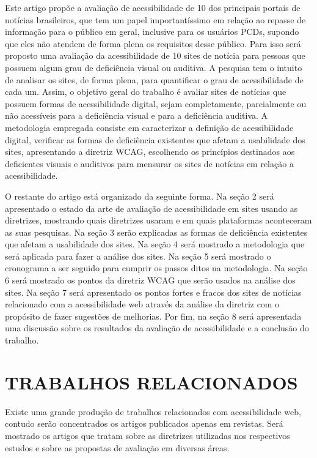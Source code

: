\documentclass[a4paper]{article}
\begin{document}
\begin{titlepage}
Este artigo propõe a avaliação de acessibilidade de 10 dos principais portais de notícias brasileiros, que tem um papel importantíssimo em relação ao repasse de informação para o público em geral, inclusive para os usuários PCDs, supondo que eles não atendem de forma plena os requisitos desse público. Para isso será proposto uma avaliação da acessibilidade de 10 sites de notícia para pessoas que possuem algum grau de deficiência visual ou auditiva. A pesquisa tem o intuito de analisar os sites, de forma plena, para quantificar o grau de acessibilidade de cada um. Assim, o objetivo geral do trabalho é avaliar sites de notícias que possuem formas de acessibilidade digital, sejam completamente, parcialmente ou não acessíveis para a deficiência visual e para a deficiência auditiva. A metodologia empregada consiste em caracterizar a definição de acessibilidade digital, verificar as formas de deficiência existentes que afetam a usabilidade dos sites, apresentando a diretriz WCAG, escolhendo os princípios destinados aos deficientes visuais e auditivos para mensurar os sites de notícias em relação a acessibilidade.

O restante do artigo está organizado da seguinte forma.
Na seção 2 será apresentado o estado da arte de avaliação de acessibilidade em sites usando as diretrizes, mostrando quais diretrizes usaram e em quais plataformas aconteceram as suas pesquisas.
Na seção 3 serão explicadas as formas de deficiência existentes que afetam a usabilidade dos sites.
Na seção 4 será mostrado a metodologia que será aplicada para fazer a análise dos sites.
Na seção 5 será mostrado o cronograma a ser seguido para cumprir os passos ditos na metodologia.
Na seção 6 será mostrado os pontos da diretriz WCAG que serão usados na análise dos sites.
Na seção 7 será apresentado os pontos fortes e fracos dos sites de notícias relacionado com a acessibilidade web através da análise da diretriz com o propósito de fazer sugestões de melhorias.
Por fim, na seção 8 será apresentada uma discussão sobre os resultados da avaliação de acessibilidade e a conclusão do trabalho.

\section{TRABALHOS RELACIONADOS}
Existe uma grande produção de trabalhos relacionados com acessibilidade web, contudo serão concentrados os artigos publicados apenas em revistas. Será mostrado os artigos que tratam sobre as diretrizes utilizadas nos respectivos estudos e sobre as propostas de avaliação em diversas áreas.


\end{titlepage}
\end{document}
